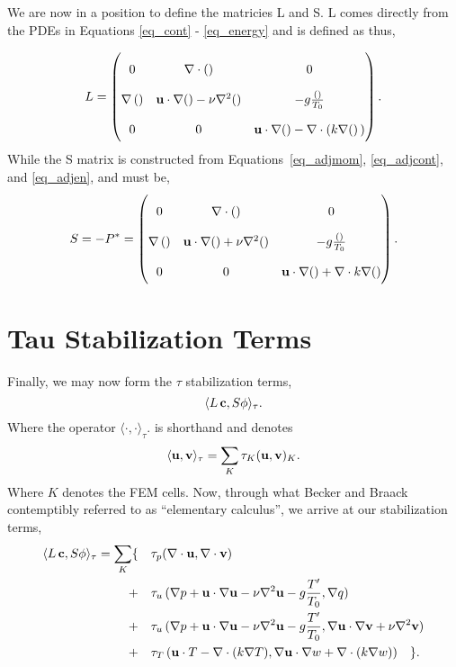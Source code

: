 We are now in a position to define the matricies L and S. L comes
directly from the PDEs in Equations \ref{eq_cont} - \ref{eq_energy} and is
defined as thus, 

\begin{equation}
\renewcommand\arraystretch{2}
 L = 
  \begin{pmatrix}
    0 & \nabla \cdot () & 0   \\
    \nabla \,() & {\bf u} \cdot \nabla() - \nu \nabla^2() & -g \frac{()}{T_0}  \\
    0 & 0 & {\bf u} \cdot \nabla() - \nabla \cdot (k \nabla() \,)
  \end{pmatrix}.
\end{equation}
%
While the S matrix is constructed from Equations~\ref{eq_adjmom},
\ref{eq_adjcont}, and \ref{eq_adjen}, and must be,  
\begin{equation}
\renewcommand\arraystretch{2}
 S = -P^* = 
  \begin{pmatrix}
    0 & \nabla \cdot () & 0   \\
    \nabla \,() & {\bf u} \cdot \nabla() + \nu \nabla^2() &  -g \frac{()}{T_0}  \\
    0 & 0 & {\bf u} \cdot \nabla() + \nabla \cdot k \nabla()
  \end{pmatrix}.
\end{equation}

%
%
\section{Tau Stabilization Terms}

Finally, we may now form the $\tau$ stabilization terms, 
\begin{equation}
 \langle L\, {\bf c},S{\bf \phi} \rangle_\tau. 
\end{equation}
Where the operator $ \langle \cdot,\cdot \rangle_\tau. $ is shorthand 
and denotes
\begin{equation}
 \langle {\bf u},{\bf v} \rangle_\tau = \sum_K \tau_K ({\bf u},{\bf v})_K.
\end{equation}
Where $K$ denotes the FEM cells. Now, through what Becker and Braack
contemptibly referred to as ``elementary calculus'', we arrive at our
stabilization terms,  
\begin{align*}
 \langle L\,{\bf c},S{\bf \phi} \rangle_\tau = \sum_K \{ \quad &\tau_p (\nabla \cdot {\bf u},
 \nabla \cdot {\bf v}) \\
 +\quad &\tau_u \,(\nabla p + {\bf u} \cdot \nabla {\bf u} - \nu
 \nabla^2 {\bf u} - g \frac{T'}{T_0},
 \nabla q) \\
 +\quad &\tau_u \, (\nabla p + {\bf u} \cdot \nabla {\bf u} - \nu \nabla^2 {\bf u}- g \frac{T'}{T_0},
 \nabla {\bf u} \cdot \nabla {\bf v} + \nu \nabla^2 {\bf v}) \\
 +\quad &\tau_T \, ({\bf u} \cdot T - \nabla \cdot (k \nabla T), \nabla {\bf u} \cdot \nabla
 w + \nabla \cdot (k \nabla w)) \quad \}.
\end{align*}

